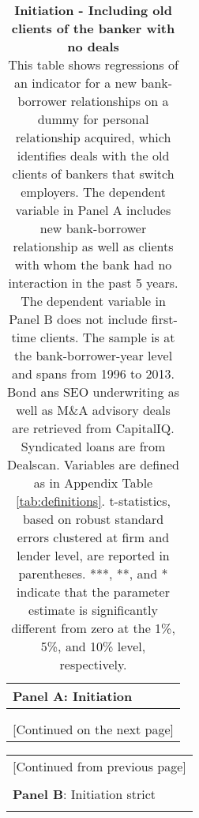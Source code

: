 \begin{table}[H] \begin{center} 
		\caption{\textbf{Initiation - Including old clients of the banker with no deals} \\ This table shows regressions of an indicator for a new bank-borrower relationships  on a dummy for personal relationship acquired, which identifies deals with the old clients of bankers that switch employers. The dependent variable in Panel A includes new bank-borrower relationship as well as clients with whom the bank had no interaction in the past 5 years. The dependent variable in Panel B does not include first-time clients. The sample is at the bank-borrower-year level and spans from 1996 to 2013. Bond ans SEO underwriting as well as M\&A advisory deals are retrieved from CapitalIQ. Syndicated loans are from Dealscan. Variables are defined as in Appendix Table \ref{tab:definitions}. t-statistics, based on robust standard errors clustered at firm and lender level, are reported in parentheses. ***, **, and * indicate that the parameter estimate is significantly different from zero at the 1\%, 5\%, and 10\% level, respectively. } %
		\label{tab:main_init} 
	\begin{threeparttable} 
		\begin{tabular*}{\hsize}{@{\hskip\tabcolsep\extracolsep\fill}l*{5}{c}}
			\multicolumn{5}{l}{\textbf{Panel A}: Initiation} \\
			\toprule  
				\def\sym#1{\ifmmode^{#1}\else\(^{#1}\)\fi}
				  \\
			\bottomrule \\  \multicolumn{6}{c}{[Continued on the next page]}  \end{tabular*}
			\end{threeparttable}   \end{center} \end{table}
\newpage
		\begin{table}[H] \begin{center} 
		\begin{threeparttable} 
		\begin{tabular*}{\hsize}{@{\hskip\tabcolsep\extracolsep\fill}l*{5}{c}}
			 \multicolumn{6}{c}{[Continued from previous page]} \\ \\
			 \multicolumn{5}{l}{\textbf{Panel B}: Initiation strict} \\
			\toprule  
				\def\sym#1{\ifmmode^{#1}\else\(^{#1}\)\fi}
				 
			\bottomrule \end{tabular*}
	\end{threeparttable} \end{center}
\end{table}
\clearpage \newpage

